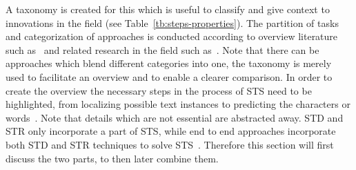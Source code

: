 A taxonomy is created for this which is useful to classify and give context to innovations in the
field (see Table~\ref{tb:steps-properties}).
The partition of tasks and categorization of approaches is conducted according to overview literature
such as~\cite{long_scene_2021,chen_text_2021,cong_comparative_2019} and related research in the
field such as~\cite{qiao_text_2021,sheng_centripetaltext_2021,liu_accurate_2020,deng_pixellink_2018}.
Note that there can be approaches which blend different categories into one, the taxonomy
is merely used to facilitate an overview and to enable a clearer comparison.
In order to create the overview the necessary steps in the process of \ac{STS} need to be
highlighted, from localizing possible text instances to predicting the characters or
words~\citep{long_scene_2021, sourvanos_challenges_2018}.
Note that details which are not essential are abstracted away.
\ac{STD} and \ac{STR} only incorporate a part of \ac{STS}, while end to end approaches
incorporate both \ac{STD} and \ac{STR} techniques to solve
\ac{STS}~\citep{long_scene_2021,ghosh_visual_2017,chen_text_2021}.
Therefore this section will first discuss the two parts, to then later combine them.

